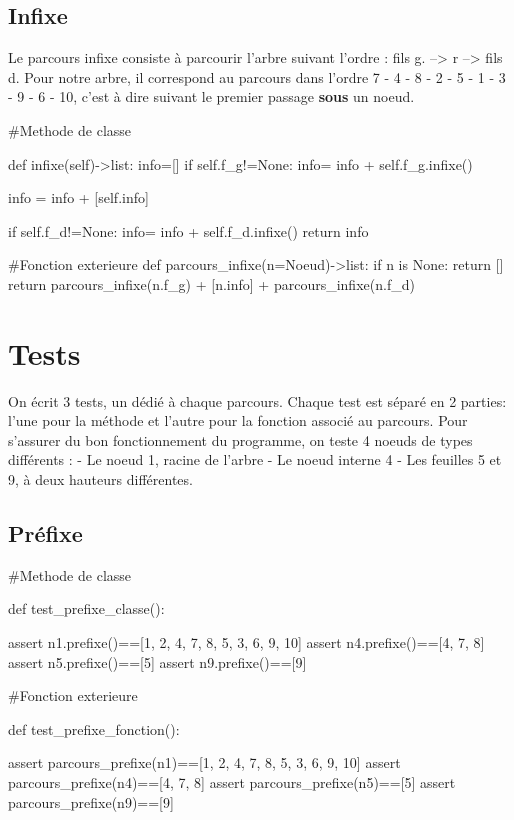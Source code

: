 \documentclass{article}
\begin{document}
\subsection{Infixe}
Le parcours infixe consiste à parcourir l'arbre suivant l'ordre : fils g. --> r --> fils d.
 Pour notre arbre, il correspond au parcours dans 
 l’ordre 7 - 4 - 8 - 2 - 5 - 1 - 3 - 9 - 6 - 10,
 c'est à dire suivant le premier passage \textbf{sous} un noeud.
\begin{python}
    #Methode de classe

    def infixe(self)->list:
    info=[]
    if self.f_g!=None:
        info= info + self.f_g.infixe() 
         
    info = info + [self.info]
    
    if self.f_d!=None:
        info= info + self.f_d.infixe()
    return info
    
    #Fonction exterieure
    def parcours_infixe(n=Noeud)->list:
    if n is None:
        return []
    return parcours_infixe(n.f_g) + [n.info] + parcours_infixe(n.f_d)

\end{python}
\section{Tests}
On écrit 3 tests, un dédié à chaque parcours.
Chaque test est séparé en 2 parties: l'une pour la méthode et l'autre pour la fonction associé au parcours.
Pour s'assurer du bon fonctionnement du programme, on teste 4 noeuds de types différents :
\newline
- Le noeud 1, racine de l'arbre
\newline
- Le noeud interne 4
\newline
- Les feuilles 5 et 9, à deux hauteurs différentes.
\subsection{Préfixe}


\begin{python}

    #Methode de classe

    def test_prefixe_classe():
        
        assert n1.prefixe()==[1, 2, 4, 7, 8, 5, 3, 6, 9, 10]
        assert n4.prefixe()==[4, 7, 8]
        assert n5.prefixe()==[5]
        assert n9.prefixe()==[9]

    #Fonction exterieure

    def test_prefixe_fonction():
    
        assert parcours_prefixe(n1)==[1, 2, 4, 7, 8, 5, 3, 6, 9, 10]
        assert parcours_prefixe(n4)==[4, 7, 8]
        assert parcours_prefixe(n5)==[5]
        assert parcours_prefixe(n9)==[9]
\end{python}
\newpage
\end{document}
